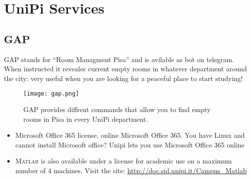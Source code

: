 \documentclass[11pt,fleqn,oneside]{book} %
\begin{document}

\chapter{UniPi Services}


\section{GAP}
GAP stands for ``Room Managment Pisa'' and is avilable as bot on telegram. When instructed it reveales current empty rooms in whatever department around the city: very useful when you are looking for a peaceful place to start studying!
\begin{figure}[h]
  \centering\texttt{[image: gap.png]}
  \caption{GAP provides diffrent commands that allow you to find empty rooms in Pisa in every UniPi department.}
\end{figure}


\begin{itemize}
  \item Microsoft Office 365 license, online Microsoft Office 365. You have Linux and cannot install Microsoft office? Unipi lets you use Microsoft Office 365 online
  \item \textsc{Matlab} is also available under a license for academic use on a maximum number of 4 machines. Visit the site: \url{http://doc.sid.unipi.it/Campus_Matlab}
\end{itemize}  
\end{document}
